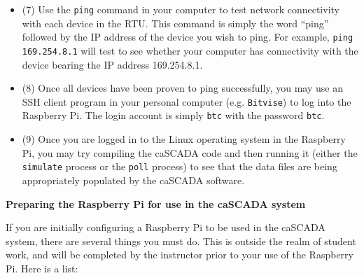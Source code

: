 \begin{itemize}
\vskip 10pt
\item{(7)} Use the {\tt ping} command in your computer to test network connectivity with each device in the RTU.  This command is simply the word ``ping'' followed by the IP address of the device you wish to ping.  For example, {\tt ping 169.254.8.1} will test to see whether your computer has connectivity with the device bearing the IP address 169.254.8.1.
\vskip 10pt
\item{(8)} Once all devices have been proven to ping successfully, you may use an SSH client program in your personal computer (e.g. {\tt Bitvise}) to log into the Raspberry Pi.  The login account is simply {\tt btc} with the password {\tt btc}.
\vskip 10pt
\item{(9)} Once you are logged in to the Linux operating system in the Raspberry Pi, you may try compiling the caSCADA code and then running it (either the {\tt simulate} process or the {\tt poll} process) to see that the data files are being appropriately populated by the caSCADA software.
\end{itemize}






\vfil \eject

\noindent
{\bf Preparing the Raspberry Pi for use in the caSCADA system}

\vskip 10pt

If you are initially configuring a Raspberry Pi to be used in the caSCADA system, there are several things you must do.  This is outside the realm of student work, and will be completed by the instructor prior to your use of the Raspberry Pi.  Here is a list:

